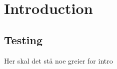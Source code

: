 \chapter{Introduction}
\label{ch:introduction}

\section{Testing}
Her skal det stå noe greier for intro